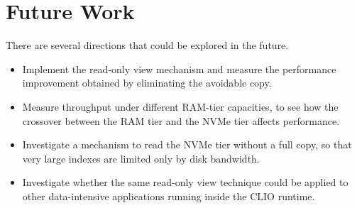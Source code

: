 \documentclass[11pt]{article}
\begin{document}
\section*{Future Work}

There are several directions that could be explored in the future.

\begin{itemize}

\item Implement the read-only view mechanism and measure the
performance improvement obtained by eliminating the avoidable copy.

\item Measure throughput under different RAM-tier capacities, to see
how the crossover between the RAM tier and the NVMe tier affects
performance.

\item Investigate a mechanism to read the NVMe tier without a full
copy, so that very large indexes are limited only by disk bandwidth.

\item Investigate whether the same read-only view technique could be
applied to other data-intensive applications running inside the CLIO
runtime.

\end{itemize}
\end{document}

